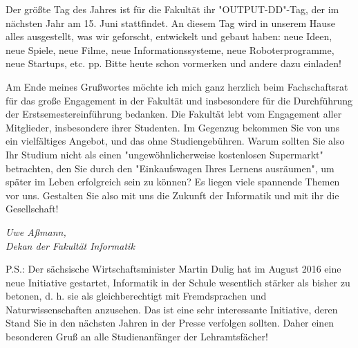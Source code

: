 Der größte Tag des Jahres ist für die Fakultät ihr "OUTPUT-DD"-Tag, der im nächsten Jahr am 15. Juni stattfindet. An diesem Tag wird in unserem Hause alles ausgestellt, was wir geforscht, entwickelt und gebaut haben: neue Ideen, neue Spiele, neue Filme, neue Informationssysteme, neue Roboterprogramme, neue Startups, etc. pp. Bitte heute schon vormerken und andere dazu einladen!

Am Ende meines Grußwortes möchte ich mich ganz herzlich beim Fachschaftsrat für das große Engagement in der Fakultät und insbesondere für die Durchführung der Erstsemestereinführung bedanken. Die Fakultät lebt vom Engagement aller Mitglieder, insbesondere ihrer Studenten. Im Gegenzug bekommen Sie von uns ein vielfältiges Angebot, und das ohne Studiengebühren. Warum sollten Sie also Ihr Studium nicht als einen "ungewöhnlicherweise kostenlosen Supermarkt" betrachten, den Sie durch den "Einkaufswagen Ihres Lernens ausräumen", um später im Leben erfolgreich sein zu können? Es liegen viele spannende Themen vor uns. Gestalten Sie also mit uns die Zukunft der Informatik und mit ihr die Gesellschaft!

\textit{Uwe Aßmann,\\
Dekan der Fakultät Informatik}

P.S.: Der sächsische Wirtschaftsminister Martin Dulig hat im August 2016 eine neue Initiative gestartet, Informatik in der Schule wesentlich stärker als bisher zu betonen, d. h. sie als gleichberechtigt mit Fremdsprachen und Naturwissenschaften anzusehen. Das ist eine sehr interessante Initiative, deren Stand Sie in den nächsten Jahren in der Presse verfolgen sollten. Daher einen besonderen Gruß an alle Studienanfänger der Lehramtsfächer!
